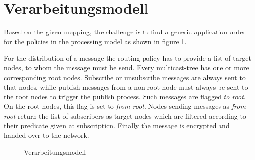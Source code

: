 \section{Verarbeitungsmodell}

Based on the given mapping, the challenge is to find a generic application order for the policies in the processing model as shown in figure \ref{fig:processing_model}.

For the distribution of a message the routing policy has to provide a list of target nodes, to whom the message must be send. Every multicast-tree has one or more corresponding root nodes. Subscribe or unsubscribe messages are always sent to that nodes, while publish messages from a non-root node must always be sent to the root nodes to trigger the publish process. Such messages are flagged \emph{to root}. On the root nodes, this flag is set to \emph{from root}. Nodes sending messages as \emph{from root} return the list of subscribers as target nodes which are filtered according to their predicate given at subscription. Finally the message is encrypted and handed over to the network.



\begin{figure}[htbp]
\centering
{}
\caption{Verarbeitungsmodell}
\label{fig:processing_model}
\end{figure}

